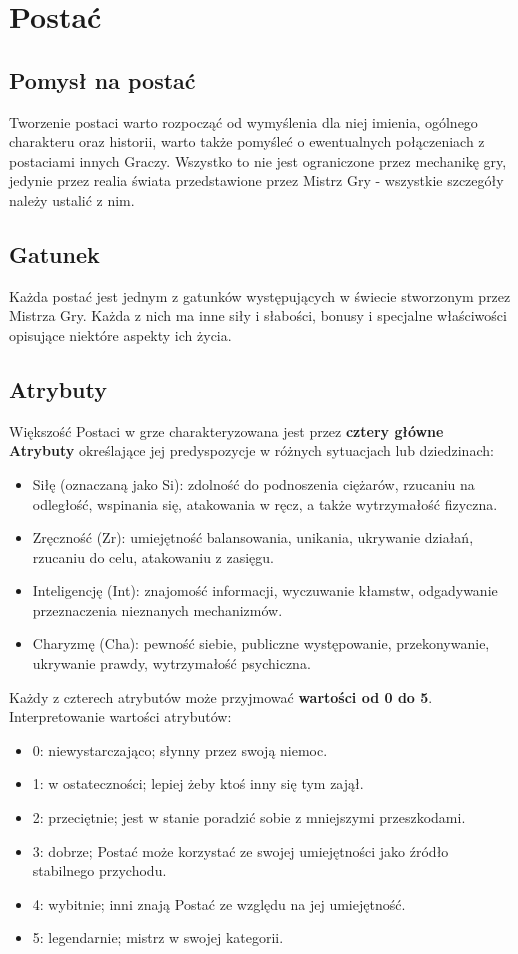 \documentclass[10pt,a4paper]{book}
\begin{document}
\section{Postać}
\begin{multicols}{2}

\subsection*{Pomysł na postać}
Tworzenie postaci warto rozpocząć od wymyślenia dla niej imienia, ogólnego charakteru oraz historii, warto także pomyśleć o ewentualnych połączeniach z postaciami innych Graczy. Wszystko to nie jest ograniczone przez mechanikę gry, jedynie przez realia świata przedstawione przez Mistrz Gry - wszystkie szczegóły należy ustalić z nim.


\subsection*{Gatunek}
Każda postać jest jednym z gatunków występujących w świecie stworzonym przez Mistrza Gry. Każda z nich ma inne siły i słabości, bonusy i specjalne właściwości opisujące niektóre aspekty ich życia.


\subsection*{Atrybuty}
Większość Postaci w grze charakteryzowana jest przez \textbf{cztery główne Atrybuty} określające jej predyspozycje w różnych sytuacjach lub dziedzinach:
\begin{itemize}
	\item Siłę (oznaczaną jako Si): zdolność do podnoszenia ciężarów, rzucaniu na odległość, wspinania się, atakowania w ręcz, a także wytrzymałość fizyczna.
	\item Zręczność (Zr): umiejętność balansowania, unikania, ukrywanie działań, rzucaniu do celu, atakowaniu z zasięgu.
	\item Inteligencję (Int): znajomość informacji, wyczuwanie kłamstw, odgadywanie przeznaczenia nieznanych mechanizmów.
	\item Charyzmę (Cha): pewność siebie, publiczne występowanie, przekonywanie, ukrywanie prawdy, wytrzymałość psychiczna.
\end{itemize}

Każdy z czterech atrybutów może przyjmować \textbf{wartości od 0 do 5}. Interpretowanie wartości atrybutów:
\begin{itemize}
	\item 0: niewystarczająco; słynny przez swoją niemoc.
	\item 1: w ostateczności; lepiej żeby ktoś inny się tym zajął.
	\item 2: przeciętnie; jest w stanie poradzić sobie z mniejszymi przeszkodami.
	\item 3: dobrze; Postać może korzystać ze swojej umiejętności jako źródło stabilnego przychodu.
	\item 4: wybitnie; inni znają Postać ze względu na jej umiejętność.
	\item 5: legendarnie; mistrz w swojej kategorii.
\end{itemize}



\end{multicols}
\end{document}
